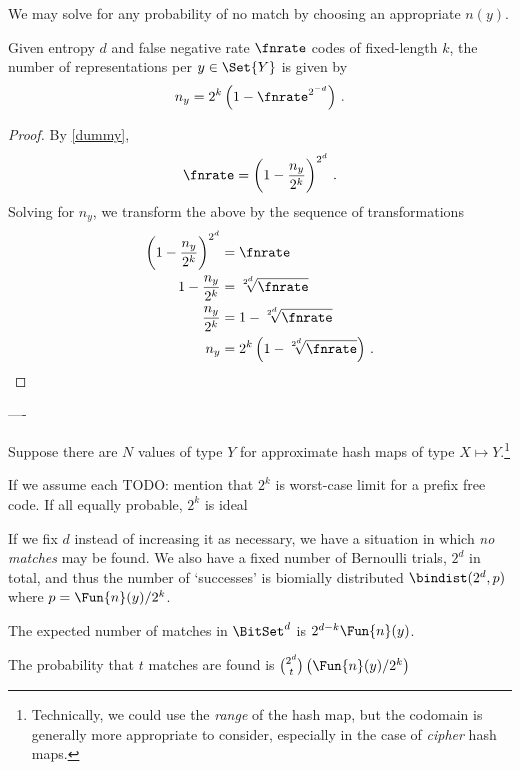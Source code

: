 \documentclass[ ../main.tex]{subfiles}
\begin{document}
We may solve for any probability of no match by choosing an appropriate $n(y)$.

\begin{theorem}
Given entropy $d$ and false negative rate $\fnrate$ codes of fixed-length $k$, the number of representations per $y \in \Set{Y}$ is given by
\begin{equation}
    n_y = 2^k\left(1 - \fnrate^{2^{-d}}\right)\,.
\end{equation}    
\end{theorem}
\begin{proof}
By \cref{dummy},
\begin{equation}
	\fnrate = \left(1-\frac{n_y}{2^k}\right)^{2^d}\,.
\end{equation}
Solving for $n_y$, we transform the above by the sequence of transformations
\begin{align}
    \left(1-\frac{n_y}{2^k}\right)^{2^d}
                       &= \fnrate\\                       
    1-\frac{n_y}{2^k}  &= \sqrt[2^d]{\fnrate}\\
    \frac{n_y}{2^k}    &= 1 - \sqrt[2^d]{\fnrate}\\
    n_y                &= 2^k\left(1 - \sqrt[2^d]{\fnrate}\right)\,.
\end{align}
\end{proof}





----


Suppose there are $N$ values of type $Y$ for approximate hash maps of type $X \mapsto Y$.\footnote{Technically, we could use the \emph{range} of the hash map, but the codomain is generally more appropriate to consider, especially in the case of \emph{cipher} hash maps.}

If we assume each 
TODO: mention that $2^k$ is worst-case limit for a prefix free code. If all equally probable, $2^k$ is ideal

If we fix $d$ instead of increasing it as necessary, we have a situation in which \emph{no matches} may be found.
We also have a fixed number of Bernoulli trials, $2^d$ in total, and thus the number of `successes' is biomially distributed $\bindist(2^d, p)$ where $p = \Fun{n}(y) / 2^k$.

The expected number of matches in $\BitSet^d$ is $2^{d-k} \Fun{n}(y)$.

The probability that $t$ matches are found is $\binom{2^d}{t} \left(\Fun{n}(y) / 2^k\right)$
\end{document}
